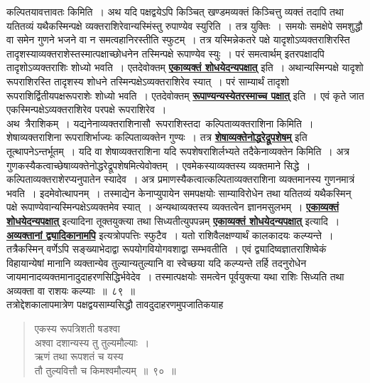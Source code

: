 \documentclass[11pt, openany]{book}
\begin{document}
कल्पितयावत्तावतः किमिति~। अथ यदि पक्षद्वयेऽपि किञ्चित् खण्डमव्यक्तं
किञ्चित्तु 
व्यक्तं तदापि तथा यतितव्यं यथैकस्मिन्पक्षे व्यक्तराशिरेवान्यस्मिंस्तु
रुपाण्येव 
स्युरिति~। तत्र युक्तिः~। समयोः समक्षेपे समशुद्धौ वा समेन गुणने भजने वा
न समत्वहानिरस्तीति स्फुटम्~। तत्र यस्मिन्नेकतरे पक्षे
यादृशोऽव्यक्तराशिरस्ति तादृशस्याव्यक्तराशेस्तस्मात्पक्षाच्छोधनेन तस्मिन्पक्षे रूपाण्येव स्युः~। परं समत्वार्थम् इतरपक्षादपि तादृशोऽव्यक्तराशिः शोध्यो भवति~। एतदेवोक्तम् \hyperref[86]{\textbf{एकाव्यक्तं शोधयेदन्यपक्षात्}} इति~। अथान्यस्मिन्पक्षे यादृशो रूपराशिरस्ति तादृशस्य
शोधने तस्मिन्पक्षेऽव्यक्तराशिरेव स्यात्~। परं साम्यार्थं तादृशो
रूपराशिर्द्वितीयपक्षरूपराशेः शोध्यो भवति~। एतदेवोक्तम् \hyperref[86]{\textbf{रूपाण्यन्यस्येतरस्माच्च पक्षात्}} इति~। एवं कृते 
जात एकस्मिन्पक्षेऽव्यक्तराशिरेव परपक्षे रूपराशिरेव~। \\

\vspace{-4mm}
 अथ \,त्रैराशिकम्~। यद्यनेनाव्यक्तराशिनासौ \,रूपराशिस्तदा \,कल्पिताव्यक्तराशिना 
किमिति~। शेषाव्यक्तराशिना रूपराशिर्भाज्यः कल्पिताव्यक्तेन गुण्यः~। तत्र
\hyperref[86]{\textbf{शेषाव्यक्तेनोद्धरेद्रूपशेषम्}} इति तूत्थापनेऽन्तर्भूतम्~। यदि वा
शेषाव्यक्तराशिना 
यदि रूपशेषराशिर्लभ्यते तदैकेनाव्यक्तेन किमिति~। अत्र
गुणकस्यैकत्वाच्छेषाव्यक्तेनोद्धरेद्रूपशेषमित्येवोक्तम्~। एवमेकस्याव्यक्तस्य व्यक्तमाने सिद्धे~। कल्पिताव्यक्तराशेरप्यनुपातेन स्यादेव~। अत्र प्रमाणस्यैकत्वात्कल्पिताव्यक्तराशिना
व्यक्तमानस्य 
गुणनमात्रं भवति~। इदमेवोत्थापनम्~। तस्माद्येन केनाप्युपायेन समपक्षयोः
साम्याविरोधेन तथा यतितव्यं यथैकस्मिन् पक्षे
रूपाण्येवान्यस्मिन्पक्षेऽव्यक्तमेव स्यात्~। अन्यथाव्यक्तस्य व्यक्तत्वेन ज्ञानमसुलभम्~। \hyperref[86]{\textbf{एकाव्यक्तं शोधयेदन्यपक्षात्}}
इत्यादिना तूक्तयुक्त्या तथा सिध्यतीत्युपपन्नम् \hyperref[86]{\textbf{एकाव्यक्तं शोधयेदन्यपक्षात्}} इत्यादि~। \hyperref[86]{\textbf{अव्यक्तानां द्व्यादिकानामपि}}  
इत्यत्रोपपत्तिः स्फुटैव~। यतो राशिवैलक्षण्यार्थं कालकादयः कल्प्यन्ते~।
तत्रैकस्मिन्
\newpage
\noindent वर्णेऽपि सङ्ख्याभेदाद्वा रूपयोगवियोगवशाद्वा सम्भवतीति~। एवं
द्व्यादिष्वज्ञातराशिष्वेकं विहायान्येषां मानानि व्यक्तान्येव तुल्यान्यतुल्यानि वा स्वेच्छया यदि कल्प्यन्ते तर्हि तदनुरोधेन जायमानादव्यक्तमानादुदाहरणसिद्धिर्भवेदेव~।
तस्मात्पक्षयोः समत्वेन पूर्वयुक्त्या यथा राशिः सिध्यति तथा अव्यक्ता वा राशयः कल्प्याः~॥~८९~॥\\

\vspace{-2mm}
 तत्रोद्देशकालापमात्रेण पक्षद्वयसाम्यसिद्धौ तावदुदाहरणमुपजातिकयाह\textendash
\begin{quote}
\eg
एकस्य रूपत्रिशती षडश्वा \\
अश्वा दशान्यस्य तु तुल्यमौल्याः~। \\
ऋणं तथा रूपशतं च यस्य \\
तौ तुल्यवित्तौ च किमश्वमौल्यम्~॥~९०~॥
\end{quote}
\end{document}
